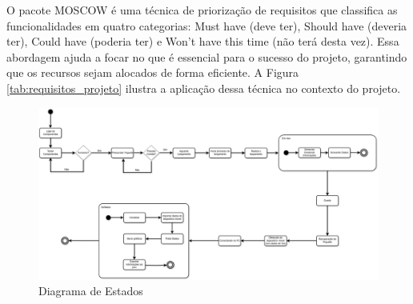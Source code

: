 \begin{samepage}
O pacote MOSCOW é uma técnica de priorização de requisitos que classifica as funcionalidades em quatro categorias: Must have (deve ter), Should have (deveria ter), Could have (poderia ter) e Won't have this time (não terá desta vez). Essa abordagem ajuda a focar no que é essencial para o sucesso do projeto, garantindo que os recursos sejam alocados de forma eficiente. A Figura \ref{tab:requisitos_projeto} ilustra a aplicação dessa técnica no contexto do projeto.

\begin{landscape}

\begin{figure}[H]
\centering
\includegraphics[width=\linewidth,keepaspectratio]{figuras/diagrama_de_estados.png}
\caption{Diagrama de Estados}
\label{fig_diagrama_estados}
\end{figure}

\end{landscape}



\end{samepage}
